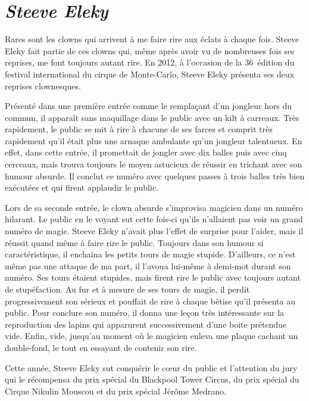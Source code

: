 \section*{\textit{Steeve Eleky}}
{}

Rares sont les clowns qui arrivent à me faire rire aux éclats à chaque fois. Steeve Eleky fait partie de ces clowns qui, même après avoir vu de nombreuses fois ses reprises, me font toujours autant rire. En 2012, à l’occasion de la 36\ieme~édition du festival international du cirque de Monte-Carlo, Steeve Eleky présenta ses deux reprises clownesques. 

Présenté dans une première entrée comme le remplaçant d’un jongleur hors du commun, il apparaît sans maquillage dans le public avec un kilt à carreaux. Très rapidement, le public se mit à rire à chacune de ses farces et comprit très rapidement qu’il était plus une arnaque ambulante qu’un jongleur talentueux. En effet, dans cette entrée, il promettait de jongler avec dix balles puis avec cinq cerceaux, mais trouva toujours le moyen astucieux de réussir en trichant avec son humour absurde. Il conclut ce numéro avec quelques passes à trois balles très bien exécutées et qui firent applaudir le public. 

Lors de sa seconde entrée, le clown absurde s’improvisa magicien dans un numéro hilarant. Le public en le voyant sut cette fois-ci qu'ils n’allaient pas voir un grand numéro de magie. Steeve Eleky n’avait plus l’effet de surprise pour l’aider, mais il réussit quand même à faire rire le public. Toujours dans son humour si caractéristique, il enchaina les petits tours de magie stupide. D’ailleurs, ce n’est même pas une attaque de ma part, il l’avoua lui-même à demi-mot durant son numéro. Ses tours étaient stupides, mais firent rire le public avec toujours autant de stupéfaction. Au fur et à mesure de ses tours de magie, il perdit progressivement son sérieux et pouffait de rire à chaque bêtise qu’il présenta au public. Pour conclure son numéro, il donna une leçon très intéressante sur la reproduction des lapins qui apparurent successivement d’une boite prétendue vide. Enfin, vide, jusqu’au moment où le magicien enleva une plaque cachant un double-fond, le tout en essayant de contenir son rire.

Cette année, Steeve Eleky sut conquérir le cœur du public et l’attention du jury qui le récompensa du prix spécial du Blackpool Tower Circus, du prix spécial du Cirque Nikulin Mouscou et du prix spécial Jérôme Medrano. 

